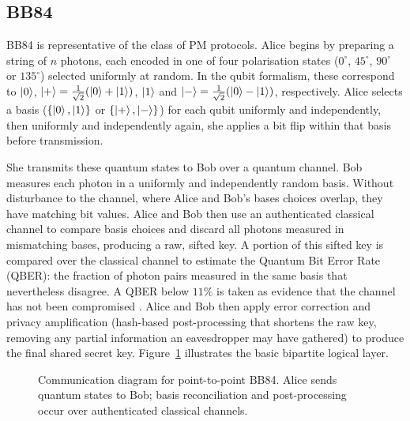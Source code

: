 \documentclass[12pt]{article}
\begin{document}
\subsection{BB84}

BB84 is representative of the class of PM protocols. Alice begins by preparing a string of $n$ photons, each encoded in one of four polarisation states ($0^\circ$, $45^\circ$, $90^\circ$ or $135^\circ$) selected uniformly at random. In the qubit formalism, these correspond to $\ket{0}$, $\ket{+} = \tfrac{1}{\sqrt{2}}(\ket{0}+\ket{1})$, $\ket{1}$ and $\ket{-} = \tfrac{1}{\sqrt{2}}(\ket{0}-\ket{1})$, respectively. Alice selects a basis ($\{\ket{0},\ket{1}\}$ or $\{\ket{+},\ket{-}\}$) for each qubit uniformly and independently, then uniformly and independently again, she applies a bit flip within that basis before transmission.

She transmits these quantum states to Bob over a quantum channel. Bob measures each photon in a uniformly and independently random basis. Without disturbance to the channel, where Alice and Bob's bases choices overlap, they have matching bit values. Alice and Bob then use an authenticated classical channel to compare basis choices and discard all photons measured in mismatching bases, producing a raw, sifted key. A portion of this sifted key is compared over the classical channel to estimate the Quantum Bit Error Rate (QBER): the fraction of photon pairs measured in the same basis that nevertheless disagree. A QBER below $11\%$ is taken as evidence that the channel has not been compromised \cite{Shor_2000}. Alice and Bob then apply error correction and privacy amplification (hash-based post-processing that shortens the raw key, removing any partial information an eavesdropper may have gathered) to produce the final shared secret key. Figure~\ref{fig:bb84_comm} illustrates the basic bipartite logical layer.

\begin{figure}[H]
    \centering
    \caption{Communication diagram for point-to-point BB84. Alice sends quantum states to Bob; basis reconciliation and post-processing occur over authenticated classical channels.}
    \label{fig:bb84_comm}
\end{figure}
\end{document}

